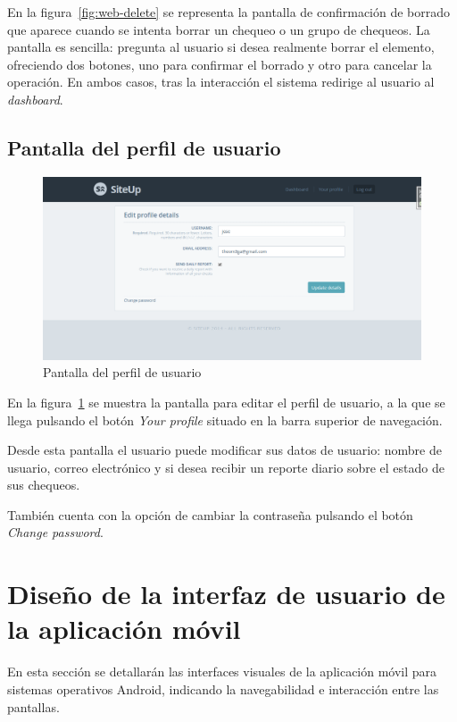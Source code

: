 En la figura~\ref{fig:web-delete} se representa la pantalla de confirmación de
borrado que aparece cuando se intenta borrar un chequeo o un grupo de
chequeos. La pantalla es sencilla: pregunta al usuario si desea realmente borrar
el elemento, ofreciendo dos botones, uno para confirmar el borrado y otro para
cancelar la operación. En ambos casos, tras la interacción el sistema redirige
al usuario al \textit{dashboard}.

\subsection{Pantalla del perfil de usuario}

\begin{figure}[htbp]
  \centering
  \includegraphics[width=\textwidth]{5_diseno/web-profile}
  \caption{Pantalla del perfil de usuario}
  \label{fig:web-profile}
\end{figure}

En la figura~\ref{fig:web-profile} se muestra la pantalla para editar el perfil
de usuario, a la que se llega pulsando el botón \textit{Your profile} situado en
la barra superior de navegación.

Desde esta pantalla el usuario puede modificar sus datos de usuario: nombre de
usuario, correo electrónico y si desea recibir un reporte diario sobre el estado
de sus chequeos.

También cuenta con la opción de cambiar la contraseña pulsando el botón
\textit{Change password}.


\FloatBarrier
\section{Diseño de la interfaz de usuario de la aplicación móvil}

En esta sección se detallarán las interfaces visuales de la aplicación móvil
para sistemas operativos Android, indicando la navegabilidad e interacción entre
las pantallas.


